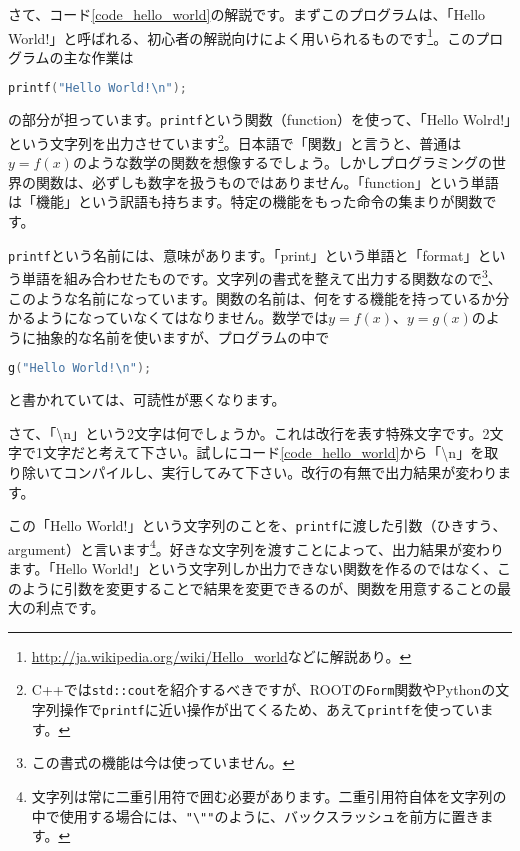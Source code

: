 さて、コード\ref{code_hello_world}の解説です。まずこのプログラムは、「Hello World!」と呼ばれる、初心者の解説向けによく用いられるものです\footnote{\url{http://ja.wikipedia.org/wiki/Hello_world}などに解説あり。}。このプログラムの主な作業は
\begin{lstlisting}[language=c++]
  printf("Hello World!\n");
\end{lstlisting}
の部分が担っています。\texttt{printf}という関数（function）を使って、「Hello Wolrd!」という文字列を出力させています\footnote{C++では\texttt{std::cout}を紹介するべきですが、ROOTの\texttt{Form}関数やPythonの文字列操作で\texttt{printf}に近い操作が出てくるため、あえて\texttt{printf}を使っています。}。日本語で「関数」と言うと、普通は$y=f(x)$のような数学の関数を想像するでしょう。しかしプログラミングの世界の関数は、必ずしも数字を扱うものではありません。「function」という単語は「機能」という訳語も持ちます。特定の機能をもった命令の集まりが関数です。

\texttt{printf}という名前には、意味があります。「print」という単語と「format」という単語を組み合わせたものです。文字列の書式を整えて出力する関数なので\footnote{この書式の機能は今は使っていません。}、このような名前になっています。関数の名前は、何をする機能を持っているか分かるようになっていなくてはなりません。数学では$y=f(x)$、$y=g(x)$のように抽象的な名前を使いますが、プログラムの中で
\begin{lstlisting}[language=c++]
  g("Hello World!\n");
\end{lstlisting}
と書かれていては、可読性が悪くなります。

さて、「\textbackslash n」という2文字は何でしょうか。これは改行を表す特殊文字です。2文字で1文字だと考えて下さい。試しにコード\ref{code_hello_world}から「\textbackslash n」を取り除いてコンパイルし、実行してみて下さい。改行の有無で出力結果が変わります。

この「Hello World!」という文字列のことを、\texttt{printf}に渡した引数（ひきすう、argument）と言います\footnote{文字列は常に二重引用符で囲む必要があります。二重引用符自体を文字列の中で使用する場合には、\texttt{"\textbackslash ""}のように、バックスラッシュを前方に置きます。}。好きな文字列を渡すことによって、出力結果が変わります。「Hello World!」という文字列しか出力できない関数を作るのではなく、このように引数を変更することで結果を変更できるのが、関数を用意することの最大の利点です。

